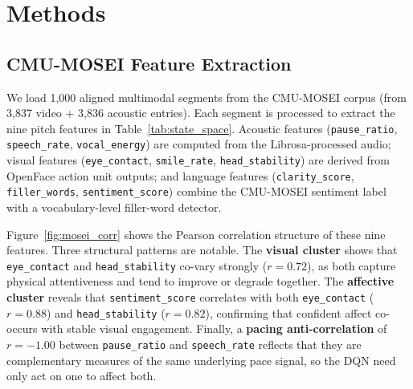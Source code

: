 \documentclass{article}
\begin{document}

\FloatBarrier
\section{Methods}

\FloatBarrier
\subsection{CMU-MOSEI Feature Extraction}
\label{sec:features}

We load 1{,}000 aligned multimodal segments from the CMU-MOSEI corpus
(from 3{,}837 video + 3{,}836 acoustic entries).
Each segment is processed to extract the nine pitch features in
Table~\ref{tab:state_space}.
Acoustic features (\texttt{pause\_ratio}, \texttt{speech\_rate},
\texttt{vocal\_energy}) are computed from the Librosa-processed audio;
visual features (\texttt{eye\_contact}, \texttt{smile\_rate},
\texttt{head\_stability}) are derived from OpenFace action unit outputs;
and language features (\texttt{clarity\_score}, \texttt{filler\_words},
\texttt{sentiment\_score}) combine the CMU-MOSEI sentiment label with a
vocabulary-level filler-word detector.

Figure~\ref{fig:mosei_corr} shows the Pearson correlation structure of these
nine features. Three structural patterns are notable.
The \textbf{visual cluster} shows that \texttt{eye\_contact} and
\texttt{head\_stability} co-vary strongly ($r=0.72$), as both capture
physical attentiveness and tend to improve or degrade together.
The \textbf{affective cluster} reveals that \texttt{sentiment\_score}
correlates with both \texttt{eye\_contact} ($r=0.88$) and
\texttt{head\_stability} ($r=0.82$), confirming that confident affect
co-occurs with stable visual engagement.
Finally, a \textbf{pacing anti-correlation} of $r=-1.00$ between
\texttt{pause\_ratio} and \texttt{speech\_rate} reflects that they are
complementary measures of the same underlying pace signal, so the DQN
need only act on one to affect both.
\end{document}
